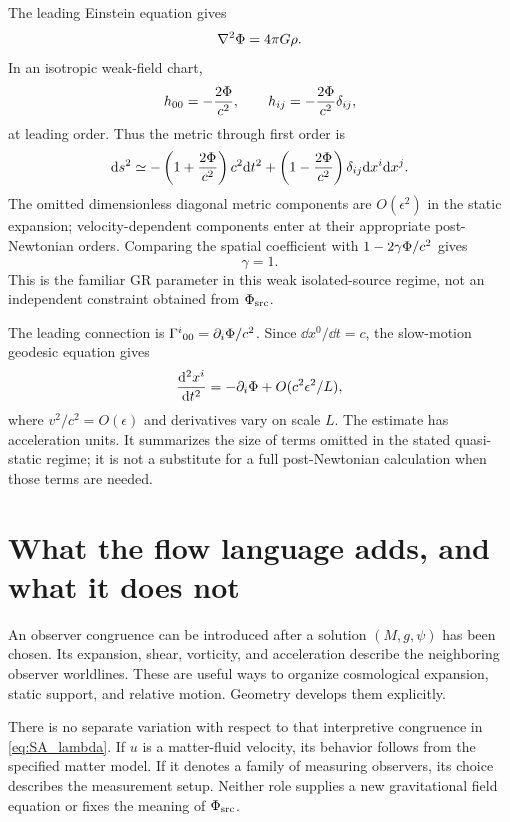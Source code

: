 \documentclass[11pt]{article}
\begin{document}
The leading Einstein equation gives
\begin{equation}
\nabla^2\Phi=4\pi G\rho.
\label{eq:poisson}
\end{equation}
In an isotropic weak-field chart,
\begin{equation}
h_{00}=-\frac{2\Phi}{c^2},\qquad h_{ij}=-\frac{2\Phi}{c^2}\delta_{ij},
\label{eq:hweakfield}
\end{equation}
at leading order. Thus the metric through first order is
\begin{equation}
\mathrm d s^2\simeq-\left(1+\frac{2\Phi}{c^2}\right)c^2\mathrm d t^2+
\left(1-\frac{2\Phi}{c^2}\right)\delta_{ij}\mathrm d x^i\mathrm d x^j.
\label{eq:weakfield}
\end{equation}
The omitted dimensionless diagonal metric components are $O(\epsilon^2)$ in the static expansion; velocity-dependent components enter at their appropriate post-Newtonian orders. Comparing the spatial coefficient with $1-2\gamma\Phi/c^2$ gives
\begin{equation}
\gamma=1.
\label{eq:gamma}
\end{equation}
This is the familiar GR parameter in this weak isolated-source regime, not an independent constraint obtained from $\Phi_{\mathrm{src}}$.

The leading connection is $\Gamma^i{}_{00}=\partial_i\Phi/c^2$. Since $\dd x^0/\dd t=c$, the slow-motion geodesic equation gives
\begin{equation}
\frac{\mathrm d^2x^i}{\mathrm d t^2}=-\partial_i\Phi+O(c^2\epsilon^2/L),
\label{eq:newtonianlimit}
\end{equation}
where $v^2/c^2=O(\epsilon)$ and derivatives vary on scale $L$. The estimate has acceleration units. It summarizes the size of terms omitted in the stated quasi-static regime; it is not a substitute for a full post-Newtonian calculation when those terms are needed.

\section{What the flow language adds, and what it does not}
An observer congruence can be introduced after a solution $(M,g,\psi)$ has been chosen. Its expansion, shear, vorticity, and acceleration describe the neighboring observer worldlines. These are useful ways to organize cosmological expansion, static support, and relative motion. Geometry develops them explicitly.

There is no separate variation with respect to that interpretive congruence in \eqref{eq:SA_lambda}. If $u$ is a matter-fluid velocity, its behavior follows from the specified matter model. If it denotes a family of measuring observers, its choice describes the measurement setup. Neither role supplies a new gravitational field equation or fixes the meaning of $\Phi_{\mathrm{src}}$.
\end{document}
